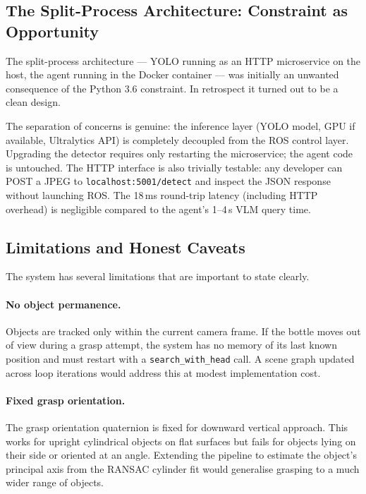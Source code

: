 \subsection{The Split-Process Architecture: Constraint as Opportunity}

The split-process architecture --- YOLO running as an HTTP microservice on the host, the
agent running in the Docker container --- was initially an unwanted consequence of the
Python 3.6 constraint.
In retrospect it turned out to be a clean design.

The separation of concerns is genuine: the inference layer (YOLO model, GPU if available,
Ultralytics API) is completely decoupled from the ROS control layer.
Upgrading the detector requires only restarting the microservice; the agent code is
untouched.
The HTTP interface is also trivially testable: any developer can POST a JPEG to
\texttt{localhost:5001/detect} and inspect the JSON response without launching ROS.
The 18\,ms round-trip latency (including HTTP overhead) is negligible compared to the
agent's 1--4\,s VLM query time.

\subsection{Limitations and Honest Caveats}

The system has several limitations that are important to state clearly.

\paragraph{No object permanence.}
Objects are tracked only within the current camera frame.
If the bottle moves out of view during a grasp attempt, the system has no memory of its
last known position and must restart with a \texttt{search\_with\_head} call.
A scene graph updated across loop iterations would address this at modest implementation
cost.

\paragraph{Fixed grasp orientation.}
The grasp orientation quaternion is fixed for downward vertical approach.
This works for upright cylindrical objects on flat surfaces but fails for objects lying
on their side or oriented at an angle.
Extending the pipeline to estimate the object's principal axis from the RANSAC cylinder
fit would generalise grasping to a much wider range of objects.

